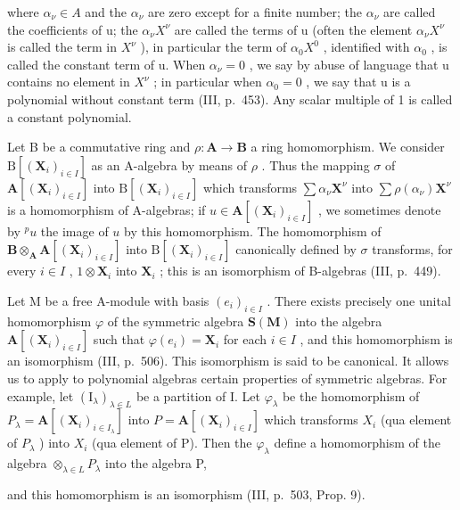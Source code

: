 where \(\alpha_{\nu}\in A\) and the \(\alpha_{\nu}\) are zero except for a finite number; the \(\alpha_{\nu}\) are called the coefficients of u; the \(\alpha_{\nu}X^{\nu}\) are called the terms of u (often the element \(\alpha_{\nu}X^{\nu}\) is called the term in \(X^{\nu}\) ), in particular the term of \(\alpha_{0}X^{0}\) , identified with \(\alpha_{0}\) , is called the constant term of u. When \(\alpha_{\nu}=0\) , we say by abuse of language that u contains no element in \(X^{\nu}\) ; in particular when \(\alpha_{0}=0\) , we say that u is a polynomial without constant term (III, p.~453). Any scalar multiple of 1 is called a constant polynomial.

Let B be a commutative ring and \(\rho: \mathbf{A} \to \mathbf{B}\) a ring homomorphism. We consider \(\mathrm{B}[(\mathbf{X}_i)_{i \in I}]\) as an A-algebra by means of \(\rho\) . Thus the mapping \(\sigma\) of \(\mathbf{A}[(\mathbf{X}_i)_{i \in I}]\) into \(\mathrm{B}[(\mathbf{X}_i)_{i \in I}]\) which transforms \(\sum \alpha_\nu \mathbf{X}^\nu\) into \(\sum \rho(\alpha_\nu) \mathbf{X}^\nu\) is a homomorphism of A-algebras; if \(u \in \mathbf{A}[(\mathbf{X}_i)_{i \in I}]\) , we sometimes denote by \(^p u\) the image of \(u\) by this homomorphism. The homomorphism of \(\mathbf{B} \otimes_{\mathbf{A}} \mathbf{A}[(\mathbf{X}_i)_{i \in I}]\) into \(\mathrm{B}[(\mathbf{X}_i)_{i \in I}]\) canonically defined by \(\sigma\) transforms, for every \(i \in I\) , \(1 \otimes \mathbf{X}_i\) into \(\mathbf{X}_i\) ; this is an isomorphism of B-algebras (III, p.~449).

Let M be a free A-module with basis \((e_{i})_{i\in I}\) . There exists precisely one unital homomorphism \(\varphi\) of the symmetric algebra \(\mathbf{S}(\mathbf{M})\) into the algebra \(\mathbf{A}[(\mathbf{X}_{i})_{i\in I}]\) such that \(\varphi(e_{i})=\mathbf{X}_{i}\) for each \(i\in I\) , and this homomorphism is an isomorphism (III, p.~506). This isomorphism is said to be canonical. It allows us to apply to polynomial algebras certain properties of symmetric algebras. For example, let \((\mathrm{I}_{\lambda})_{\lambda\in L}\) be a partition of I. Let \(\varphi_{\lambda}\) be the homomorphism of \(P_{\lambda}=\mathbf{A}[(\mathbf{X}_{i})_{i\in I_{\lambda}}]\) into \(P=\mathbf{A}[(\mathbf{X}_{i})_{i\in I}]\) which transforms \(X_{i}\) (qua element of \(P_{\lambda}\) ) into \(X_{i}\) (qua element of P). Then the \(\varphi_{\lambda}\) define a homomorphism of the algebra \(\otimes_{\lambda\in L}P_{\lambda}\) into the algebra P,

and this homomorphism is an isomorphism (III, p.~503, Prop. 9).

